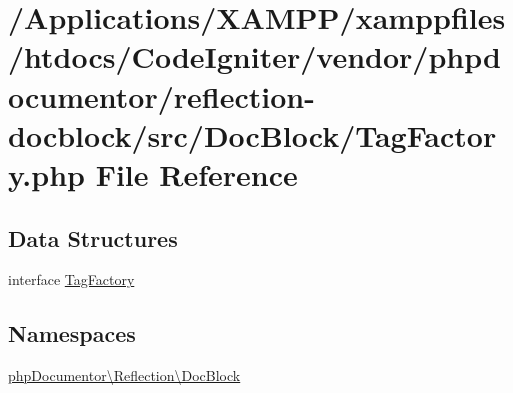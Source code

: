 \hypertarget{_tag_factory_8php}{}\section{/\+Applications/\+X\+A\+M\+P\+P/xamppfiles/htdocs/\+Code\+Igniter/vendor/phpdocumentor/reflection-\/docblock/src/\+Doc\+Block/\+Tag\+Factory.php File Reference}
\label{_tag_factory_8php}
\subsection*{Data Structures}
\begin{DoxyCompactItemize}
\item 
interface \mbox{\hyperlink{interfacephp_documentor_1_1_reflection_1_1_doc_block_1_1_tag_factory}{Tag\+Factory}}
\end{DoxyCompactItemize}
\subsection*{Namespaces}
\begin{DoxyCompactItemize}
\item 
 \mbox{\hyperlink{namespacephp_documentor_1_1_reflection_1_1_doc_block}{php\+Documentor\textbackslash{}\+Reflection\textbackslash{}\+Doc\+Block}}
\end{DoxyCompactItemize}
